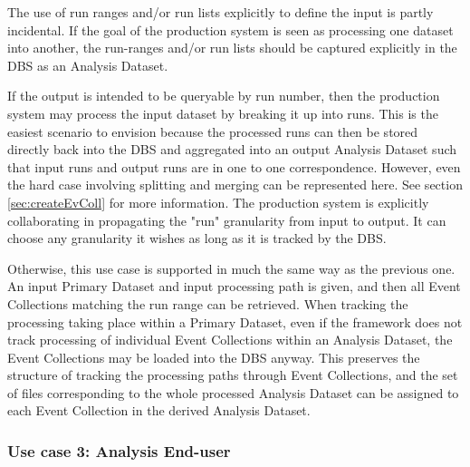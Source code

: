 \documentclass{cmspaper}
\begin{document}
The use of run ranges and/or run lists explicitly to define the input is 
partly incidental. If the goal of the production system is seen as
processing one dataset into another, the run-ranges and/or run lists 
should be captured explicitly in the DBS as an Analysis Dataset. 

If the output is intended to be queryable by run number, then the production 
system may process the input dataset by breaking it up into runs.  This is the 
easiest scenario to envision because the processed runs can then be stored 
directly back into the DBS and aggregated into an output Analysis Dataset such
that input runs and output runs are in one to one correspondence.
However, even the hard case involving splitting and merging can be represented here. 
See section \ref{sec:createEvColl} for more information. 
The production system is explicitly collaborating in propagating the
"run" granularity from input to output.  It can choose any granularity it 
wishes as long as it is tracked by the DBS.  

Otherwise, this use case is supported in much the same way as the previous one.  An input 
Primary Dataset and input processing path is given, and then all Event Collections
matching the run range can be retrieved.  When tracking the processing
taking place within a Primary Dataset, even if the framework does not track processing
of individual Event Collections within an Analysis Dataset, the Event Collections 
may be loaded into the DBS anyway.  This preserves the structure of tracking 
the processing paths through Event Collections, and the set of 
files corresponding to the whole processed Analysis Dataset can be assigned to 
each Event Collection in the derived Analysis Dataset.  

\subsubsection{Use case 3: Analysis End-user}
\end{document}
